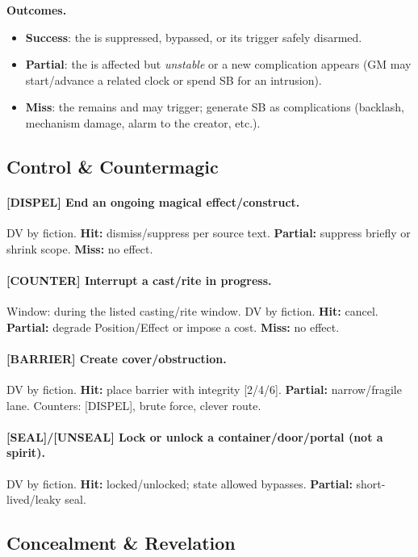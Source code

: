 \textbf{Outcomes.}
\begin{itemize}
  \item \textbf{Success}: the \WARD is suppressed, bypassed, or its trigger safely disarmed.
  \item \textbf{Partial}: the \WARD is affected but \emph{unstable} or a new complication appears (GM may start/advance a related clock or spend SB for an intrusion).
  \item \textbf{Miss}: the \WARD remains and may trigger; generate SB as complications (backlash, mechanism damage, alarm to the creator, etc.).
\end{itemize}


\subsection{Control \& Countermagic}
\paragraph{[DISPEL] End an ongoing magical effect/construct.}
DV by fiction. \textbf{Hit:} dismiss/suppress per source text. \textbf{Partial:} suppress briefly or shrink scope. \textbf{Miss:} no effect.

\paragraph{[COUNTER] Interrupt a cast/rite in progress.}
Window: during the listed casting/rite window. DV by fiction. \textbf{Hit:} cancel. \textbf{Partial:} degrade Position/Effect or impose a cost. \textbf{Miss:} no effect.

\paragraph{[BARRIER] Create cover/obstruction.}
DV by fiction. \textbf{Hit:} place barrier with integrity [2/4/6]. \textbf{Partial:} narrow/fragile lane. Counters: [DISPEL], brute force, clever route.

\paragraph{[SEAL]/[UNSEAL] Lock or unlock a container/door/portal (not a spirit).}
DV by fiction. \textbf{Hit:} locked/unlocked; state allowed bypasses. \textbf{Partial:} short-lived/leaky seal.

\subsection{Concealment \& Revelation}
